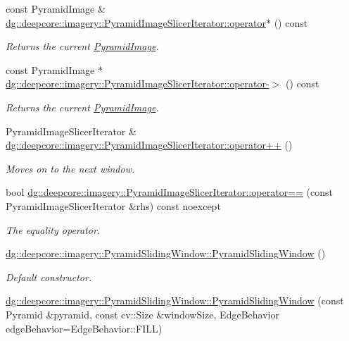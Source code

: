 \begin{DoxyCompactItemize}
const Pyramid\+Image \& \hyperlink{group___imagery_module_ga600dc58ba1610e9a397382f55c394c19}{dg\+::deepcore\+::imagery\+::\+Pyramid\+Image\+Slicer\+Iterator\+::operator$\ast$} () const 
\begin{DoxyCompactList}\small\item\em Returns the current \hyperlink{structdg_1_1deepcore_1_1imagery_1_1_pyramid_image}{Pyramid\+Image}. \end{DoxyCompactList}\item 
const Pyramid\+Image $\ast$ \hyperlink{group___imagery_module_gaf104201dafb494801f82aa216e2ea012}{dg\+::deepcore\+::imagery\+::\+Pyramid\+Image\+Slicer\+Iterator\+::operator-\/$>$} () const 
\begin{DoxyCompactList}\small\item\em Returns the current \hyperlink{structdg_1_1deepcore_1_1imagery_1_1_pyramid_image}{Pyramid\+Image}. \end{DoxyCompactList}\item 
Pyramid\+Image\+Slicer\+Iterator \& \hyperlink{group___imagery_module_ga5457c55fb683845dcd2735e8d37fe18c}{dg\+::deepcore\+::imagery\+::\+Pyramid\+Image\+Slicer\+Iterator\+::operator++} ()
\begin{DoxyCompactList}\small\item\em Moves on to the next window. \end{DoxyCompactList}\item 
bool \hyperlink{group___imagery_module_gac660f2df0d221e909f0ccf3e503e8c26}{dg\+::deepcore\+::imagery\+::\+Pyramid\+Image\+Slicer\+Iterator\+::operator==} (const Pyramid\+Image\+Slicer\+Iterator \&rhs) const noexcept
\begin{DoxyCompactList}\small\item\em The equality operator. \end{DoxyCompactList}\item 
\hyperlink{group___imagery_module_ga7081b8742fc33b80063c679df62eda40}{dg\+::deepcore\+::imagery\+::\+Pyramid\+Sliding\+Window\+::\+Pyramid\+Sliding\+Window} ()
\begin{DoxyCompactList}\small\item\em Default constructor. \end{DoxyCompactList}\item 
\hyperlink{group___imagery_module_gac631dfe3960fc55db1cd264b508d7927}{dg\+::deepcore\+::imagery\+::\+Pyramid\+Sliding\+Window\+::\+Pyramid\+Sliding\+Window} (const Pyramid \&pyramid, const cv\+::\+Size \&window\+Size, Edge\+Behavior edge\+Behavior=Edge\+Behavior\+::\+F\+I\+LL)

\end{DoxyCompactItemize}
